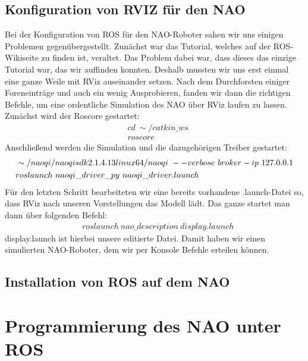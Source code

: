 \documentclass{scrartcl}
\begin{document}
\subsection{Konfiguration von RVIZ für den NAO}
Bei der Konfiguration von ROS für den NAO-Roboter sahen wir uns einigen Problemen gegenübergestellt. Zunächst war das Tutorial, welches auf der ROS-Wikiseite zu finden ist, veraltet. Das Problem dabei war, dass dieses das einzige Tutorial war, das wir auffinden konnten. Deshalb mussten wir uns erst einmal eine ganze Weile mit RViz auseinander setzen. Nach dem Durchforsten einiger Foreneinträge und auch ein wenig Ausprobieren, fanden wir dann die richtigen Befehle, um eine ordentliche Simulation des NAO über RViz laufen zu lassen.
Zunächst wird der Roscore gestartet:
\begin{align}
&cd\ \sim/catkin\_ws\\
&roscore
\end{align}
Anschließend werden die Simulation und die dazugehörigen Treiber gestartet:
\begin{align}
&\sim/naoqi/naoqi\-sdk\-2.1.4.13\-linux64/naoqi\ --verbose\ \-\-broker-ip\ 127.0.0.1\\
&roslaunch\ naoqi\_driver\_py\ naoqi\_driver.launch
\end{align}
Für den letzten Schritt bearbeiteten wir eine bereits vorhandene .launch-Datei so, dass RViz nach unseren Vorstellungen das Modell lädt. Das ganze startet man dann über folgenden Befehl:
\begin{align}
&roslaunch\ nao\_description\ display.launch
\end{align}
display.launch ist hierbei unsere editierte Datei.
Damit haben wir einen simulierten NAO-Roboter, dem wir per Konsole Befehle erteilen können.
\subsection{Installation von ROS auf dem NAO}


\section{Programmierung des NAO unter ROS}
\end{document}
